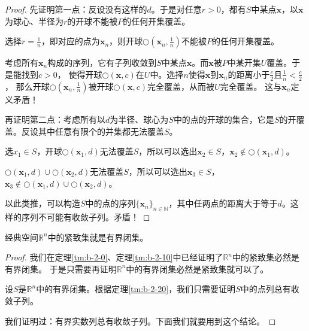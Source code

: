 \documentclass[12pt,UTF8,fontset=none]{ctexbook}
\begin{document}
\begin{appendix}
\begin{proof}
    先证明第一点：反设没有这样的$d$。于是对任意$r>0$，都有$S$中某点$\mathbf{x}$，以$\mathbf{x}$为球心、半径为$r$的开球不能被$P$的任何开集覆盖。

    选择$r = \frac{1}{n}$，即对应的点为$\mathbf{x}_n$，则开球$\bigcirc\left(\mathbf{x}_n,\frac{1}{n}\right)$不能被$P$的任何开集覆盖。

    考虑所有$\mathbf{x}_n$构成的序列，它有子列收敛到$S$中某点$\mathbf{x}$。而$\mathbf{x}$被$P$中某开集$U$覆盖。于是能找到$c>0$，
    使得开球$\bigcirc(\mathbf{x},c)$在$U$中。选择$n$使得$\mathbf{x}$到$\mathbf{x}_n$的距离小于$\frac{c}{2}$且$\frac{1}{n} < \frac{c}{2}$，
    那么开球$\bigcirc\left(\mathbf{x}_n,\frac{1}{n}\right)$被开球$\bigcirc(\mathbf{x},c)$完全覆盖，从而被$U$完全覆盖。
    这与$\mathbf{x}_n$定义矛盾！

    再证明第二点：考虑所有以$d$为半径、球心为$S$中的点的开球的集合，它是$S$的开覆盖。反设其中任意有限个的并集都无法覆盖$S$。

    选$x_1\in S$，开球$\bigcirc(\mathbf{x}_1,d)$无法覆盖$S$，所以可以选出$\mathbf{x}_2\in S$，$\mathbf{x}_2\notin \bigcirc(\mathbf{x}_1,d)$。

    $\bigcirc(\mathbf{x}_1,d)\cup \bigcirc(\mathbf{x}_2,d)$无法覆盖$S$，所以可以选出$\mathbf{x}_3\in S$，$\mathbf{x}_3\notin \bigcirc(\mathbf{x}_1,d)\cup \bigcirc(\mathbf{x}_2,d)$。

    以此类推，可以构造$S$中的点的序列$\{\mathbf{x}_n\}_{n\in\mathbb{N}}$，其中任两点的距离大于等于$d$。这样的序列不可能有收敛子列。矛盾！

\end{proof}

\begin{tm}
    经典空间$\mathbb{R}^n$中的紧致集就是有界闭集。
\end{tm}

\begin{proof}
    我们在定理\ref{tm:b-2-0}、定理\ref{tm:b-2-10}中已经证明了$\mathbb{R}^n$中的紧致集必然是有界闭集。
    于是只需要再证明$\mathbb{R}^n$中的有界闭集必然是紧致集就可以了。

    设$S$是$\mathbb{R}^n$中的有界闭集。根据定理\ref{tm:b-2-20}，我们只需要证明$S$中的点列总有收敛子列。

    我们证明过：有界实数列总有收敛子列。下面我们就要用到这个结论。


\end{proof}
\end{appendix}
\end{document}
